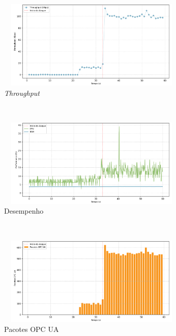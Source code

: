 \begin{apendicesenv}
\begin{figure}[htbp!]
    \centering
    \caption{\label{fig:0-dos_open_multiple_secure_channels}Gráficos do ataque de DoS pela abertura de múltiplos canais seguros - nível de segurança: `None'.}
    \begin{subfigure}[t]{0.5\textwidth}
        \centering
        \caption{\textit{Throughput}}
        \includegraphics[width=1\textwidth, height=120pt]{USPSC-img/output/cropped/0-dos_open_multiple_secure_channels-tput.png}
    \end{subfigure}%
    ~ 
    \begin{subfigure}[t]{0.5\textwidth}
        \centering
        \caption{Desempenho}
        \includegraphics[width=1\textwidth, height=120pt]{USPSC-img/output/cropped/0-dos_open_multiple_secure_channels-perf.png}
    \end{subfigure}%
    \\
    \begin{subfigure}[t]{0.5\textwidth}
        \centering
        \caption{Pacotes OPC UA}
        \includegraphics[width=1\textwidth, height=120pt]{USPSC-img/output/cropped/0-dos_open_multiple_secure_channels-pack.png}
    \end{subfigure}%
    ~
    \begin{subfigure}[t]{0.5\textwidth}

\end{subfigure}
\end{figure}
\end{apendicesenv}
